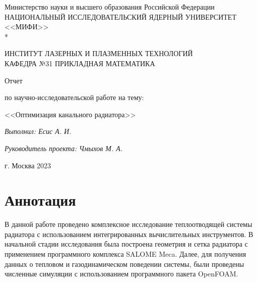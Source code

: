 \documentclass[a4paper,12pt]{article}
\theoremstyle{plain} %
\theoremstyle{definition} %
\theoremstyle{remark} %
\begin{document}
\renewcommand{\contentsname}{\Large Содержание}
\renewcommand{\bibname}{\normalfont\Large\bfseries Список литературы}

\begin{titlepage}
	\begin{center}
		Министерство науки и высшего образования Российской Федерации \\
		НАЦИОНАЛЬНЫЙ ИССЛЕДОВАТЕЛЬСКИЙ ЯДЕРНЫЙ УНИВЕРСИТЕТ <<МИФИ>> \\*
		\hrulefill
	\end{center}
	
	\begin{center}
		ИНСТИТУТ ЛАЗЕРНЫХ И ПЛАЗМЕННЫХ ТЕХНОЛОГИЙ\\
		КАФЕДРА №31 ПРИКЛАДНАЯ МАТЕМАТИКА
	\end{center}
	\vspace{1cm}
	
	\vspace{2em}
	
	\begin{center}
		\large{Отчет}
		
		по научно-исследовательской работе на тему:
	\end{center}
	\begin{center}
		\large <<Оптимизация канального радиатора>>
	\end{center}
	\begin{center}
		\large \textit{Выполнил: Есис А. И.}
		
		\textit{Руководитель проекта: Чмыхов М. А.}
	\end{center}
	
	
	\vspace{22em}
	
	\begin{center}
		г. Москва 2023
	\end{center}
\end{titlepage}

\newpage
\section*{Аннотация}

В данной работе проведено комплексное исследование теплоотводящей системы радиатора с использованием интегрированных вычислительных инструментов. В начальной стадии исследования была построена геометрия и сетка радиатора с применением программного комплекса SALOME Meca. Далее, для получения данных о тепловом и газодинамическом поведении системы, были проведены численные симуляции с использованием программного пакета OpenFOAM.
\end{document}
